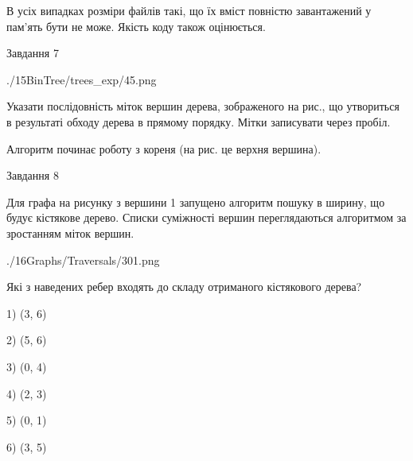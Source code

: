 \documentclass[12pt, ukrainian]{article}
\begin{document}
{В усіх випадках розміри файлів такі, що їх вміст повністю завантажений у пам'ять бути не може. Якість коду також оцінюється.



\vspace{10mm}\par

\newpage
\begin{minipage}[t]{9.7cm}
               
{\begin{center}Завдання {7}\end{center}}
\vspace{-6mm}

\begin{center}
	{./15BinTree/trees_exp/45.png}
\end{center}
Указати послідовність міток вершин дерева, зображеного на рис., що утвориться в результаті обходу дерева в прямому порядку. Мітки записувати через пробіл.\par Алгоритм починає роботу з кореня (на рис. це верхня вершина).\par

\end{minipage}
\vline \hspace{8mm}
\begin{minipage}[t]{8.0cm}
               
{\begin{center}Завдання {8}\end{center}}
\vspace{-6mm}
Для графа на рисунку з вершини 1 запущено алгоритм пошуку в ширину, що будує кістякове дерево. Списки суміжності вершин переглядаються алгоритмом за зростанням міток вершин.\par
\begin{center}
	{./16Graphs/Traversals/301.png}
\end{center}
\par Які з наведених ребер входять до складу отриманого кістякового дерева?\par
1) (3, 6)\par
2) (5, 6)\par
3) (0, 4)\par
4) (2, 3)\par
5) (0, 1)\par
6) (3, 5)\par
{\vskip 15pt} \par


\end{minipage}}
\end{document}
